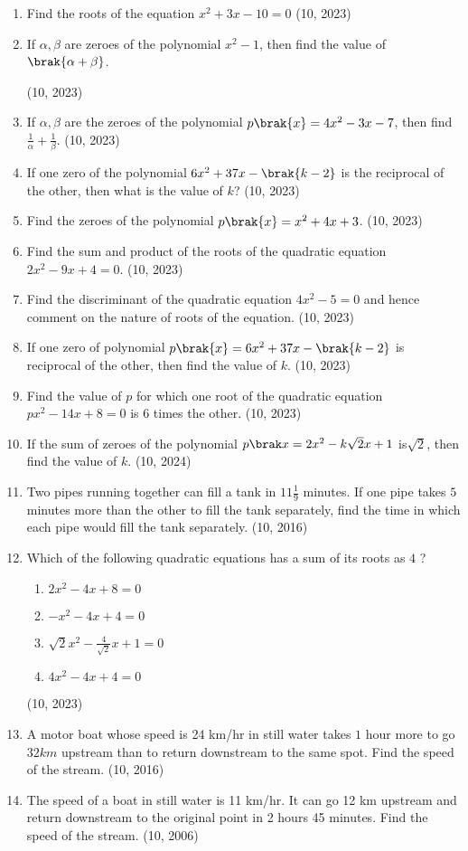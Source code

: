 \begin{enumerate}[label=\thesubsection.\arabic*,ref=\thesubsection.\theenumi]
\item Find the roots of the equation $x^2 + 3x - 10 = 0$ 
\hfill	(10, 2023)
\item If $\alpha, \beta$ are zeroes of the polynomial $x^2 - 1$, then find the value of $\brak{\alpha + \beta}$.

\hfill	(10, 2023)
\item If $ \alpha, \beta $ are the zeroes of the polynomial $ p\brak{x} = 4x^2 - 3x - 7 $, then find $ \frac{1}{\alpha} + \frac{1}{\beta} $.
\hfill	(10, 2023)
\item If one zero of the polynomial $6x^2 + 37x - \brak{k-2}$ is the reciprocal of the other,
    then what is the value of $k$?
\hfill	(10, 2023)
    \item Find the zeroes of the polynomial $p\brak{x} = x ^ 2 + 4x + 3$. 
\hfill	(10, 2023)
\item
Find the sum and product of the roots of the quadratic equation $2x^{2}-9x+4=0$.
\hfill	(10, 2023)
\item
Find the discriminant of the quadratic equation $4x^{2}-5=0$ and hence comment on the nature of roots of the equation.
\hfill	(10, 2023)
\item
If one zero of polynomial $p\brak{x}=6x^{2}+37x-\brak{k-2}$ is reciprocal of the other, then  find the value of $k$.
\hfill	(10, 2023)
\item
Find the value of $p$ for which one root of the quadratic equation $px^{2}-14x+8=0$ is $6$ times the other.
\hfill	(10, 2023)
\item If the sum of zeroes of the polynomial $ p\brak x = 2x^2 - k\sqrt2x+1 $ is${\sqrt2} $, then find the value of $k$. 
\hfill	(10, 2024)
\item Two pipes running together can fill a tank in $11\frac{1}{9}$ minutes. If one pipe takes $5$ minutes more than the other to fill the tank separately, find the time in which each pipe would fill the tank separately.
\hfill	(10, 2016)
%
\item Which of the following quadratic equations has a sum of its roots as  $4$ ?  
\begin{enumerate}
\item $ 2x^2 - 4x + 8 = 0 $                          
\item $ -x^2 - 4x + 4 = 0 $                          
\item $ \sqrt{2}x^2 - \frac{4}{\sqrt{2}}x + 1 = 0 $
\item $ 4x^2 - 4x + 4 = 0 $
\end{enumerate}
\hfill	(10, 2023)
\item A motor boat whose speed is 24 km/hr in still water takes $1$ hour     more to go $32 km$ upstream than to return downstream to the same spot. Find the speed of the stream.
\hfill	(10, 2016)
\item The speed of a boat in still water is 11 km/hr. It can go 12 km upstream and return 
downstream to the original point in 2 hours 45 minutes. Find the speed of the stream.
\hfill	(10, 2006)
\end{enumerate}
